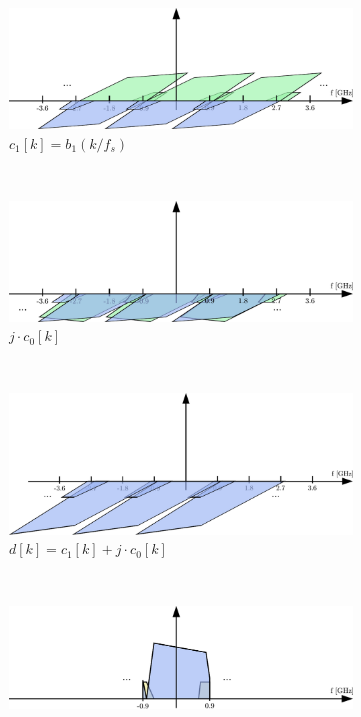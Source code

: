 \begin{figure}[p]
\begin{subfigure}{0.45\textwidth}
    \centering
    \includegraphics[width=\textwidth]{figures/rx_2_freq_c_1}
    \caption{$c_1[k] = b_1(k / f_s)$}
    \label{fig:rx_2_freq_c_1}
  \end{subfigure}
  \vspace{4ex} \\
  \begin{subfigure}{0.45\textwidth}
    \centering
    \includegraphics[width=\textwidth]{figures/rx_2_freq_jc0}
    \caption{$j \cdot c_0[k]$}
    \label{fig:rx_2_freq_jc0}
  \end{subfigure}
  ~
  \begin{subfigure}{0.45\textwidth}
    \centering
    \includegraphics[width=\textwidth]{figures/rx_2_freq_d}
    \caption{$d[k] = c_1[k] + j \cdot c_0[k]$}
    \label{fig:rx_2_freq_d}
  \end{subfigure}
  \vspace{4ex} \\
  \begin{subfigure}{0.45\textwidth}
    \centering
    \includegraphics[width=\textwidth]{figures/rx_2_freq_e}

\end{subfigure}
\end{figure}
